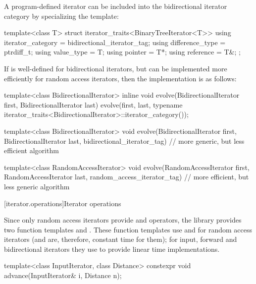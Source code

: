 \pnum
\begin{example}
A program-defined iterator 
can be included into the bidirectional iterator category by
specializing the  template:
\begin{codeblock}
template<class T> struct iterator_traits<BinaryTreeIterator<T>> {
  using iterator_category = bidirectional_iterator_tag;
  using difference_type   = ptrdiff_t;
  using value_type        = T;
  using pointer           = T*;
  using reference         = T&;
};
\end{codeblock}
\end{example}

\pnum
\begin{example}
If
is well-defined for bidirectional iterators, but can be implemented more
efficiently for random access iterators, then the implementation is as follows:
\begin{codeblock}
template<class BidirectionalIterator>
inline void
evolve(BidirectionalIterator first, BidirectionalIterator last) {
  evolve(first, last,
    typename iterator_traits<BidirectionalIterator>::iterator_category());
}

template<class BidirectionalIterator>
void evolve(BidirectionalIterator first, BidirectionalIterator last,
  bidirectional_iterator_tag) {
  // more generic, but less efficient algorithm
}

template<class RandomAccessIterator>
void evolve(RandomAccessIterator first, RandomAccessIterator last,
  random_access_iterator_tag) {
  // more efficient, but less generic algorithm
}
\end{codeblock}
\end{example}

[iterator.operations]{Iterator operations}

\pnum
Since only random access iterators provide
\tcode{+}
and
\tcode{-}
operators, the library provides two
function templates
and
.
These
function templates
use
\tcode{+}
and
\tcode{-}
for random access iterators (and are, therefore, constant
time for them); for input, forward and bidirectional iterators they use
\tcode{++}
to provide linear time
implementations.

%
\begin{itemdecl}
template<class InputIterator, class Distance>
  constexpr void advance(InputIterator& i, Distance n);
\end{itemdecl}

